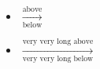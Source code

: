 \documentclass[varwidth]{standalone}
\begin{document}
    \begin{itemize}
        \item $\xrightarrow[\text{below}]{\text{above}}$
        \item $\xrightarrow[\text{very very long below}]{\text{very very long above}}$
    \end{itemize}
\end{document}
